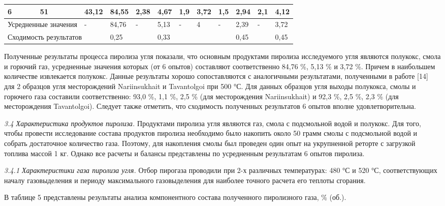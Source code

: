 \begin{table}[H]
{\begin{tabular}{|llllllllllll|}
\multicolumn{1}{|l|}{6} & \multicolumn{1}{l|}{51} & \multicolumn{1}{l|}{43,12} & \multicolumn{1}{l|}{84,55} & \multicolumn{1}{l|}{2,38} & \multicolumn{1}{l|}{4,67} & \multicolumn{1}{l|}{1,9} & \multicolumn{1}{l|}{3,72} & \multicolumn{1}{l|}{1,5} & \multicolumn{1}{l|}{2,94} & \multicolumn{1}{l|}{2,1} & 4,12 \\ \hline
\multicolumn{2}{|l|}{Усредненные значения} & \multicolumn{1}{l|}{-} & \multicolumn{1}{l|}{84,76} & \multicolumn{1}{l|}{-} & \multicolumn{1}{l|}{5,13} & \multicolumn{1}{l|}{-} & \multicolumn{1}{l|}{4} & \multicolumn{1}{l|}{-} & \multicolumn{1}{l|}{2,39} & \multicolumn{1}{l|}{-} & 3,72 \\ \hline
\multicolumn{3}{|l|}{Сходимость результатов} & \multicolumn{1}{l|}{0,25} & \multicolumn{1}{l|}{} & \multicolumn{1}{l|}{0,33} & \multicolumn{1}{l|}{} & \multicolumn{1}{l|}{} & \multicolumn{1}{l|}{} & \multicolumn{1}{l|}{0,45} & \multicolumn{1}{l|}{} & 0,45 \\ \hline
\end{tabular}
}
\end{table}

\begin{multicols}{2}
Полученные результаты процесса пиролиза угля показали, что основным
продуктами пиролиза исследуемого угля являются полукокс, смола и горючий
газ, усредненные значения которых (от 6 опытов) составляют
соответственно 84,76 \%, 5,13 \% и 3,72 \%. Причем в наибольшем
количестве извлекается полукокс. Данные результаты хорошо сопоставляются
с аналогичными результатами, полученными в работе {[}14{]} для 2
образцов угля месторождений Nariinsukhait и Tavantolgoi при 500 °С. Для
данных образцов угля выходы полукокса, смолы и горючего газа составили
соответственно: 93,0 \%, 1,1 \%, 2,5 \% (для месторождения
Nariinsukhait) и 92,3 \%, 2,5 \%, 2,3 \% (для месторождения
Tavantolgoi). Следует также отметить, что сходимость полученных
результатов 6 опытов вполне удовлетворительна.

\emph{3.4 Характеристика продуктов пиролиза.} Продуктами пиролиза угля
являются газ, смола с подсмольной водой и полукокс. Для того, чтобы
провести исследование состава продуктов пиролиза необходимо было
накопить около 50 грамм смолы с подсмольной водой и собрать достаточное
количество газа. Поэтому, для накопления смолы был проведен один опыт на
укрупненной реторте с загрузкой топлива массой 1 кг. Однако все расчеты
и балансы представлены по усредненным результатам 6 опытов пиролиза.

\emph{3.4.1 Характеристики газа пиролиза угля.} Отбор пирогаза проводили
при 2-х различных температурах: 480 °С и 520 °С, соответствующих началу
газовыделения и периоду максимального газовыделения для наиболее точного
расчета его теплоты сгорания.

В таблице 5 представлены результаты анализа компонентного состава
полученного пиролизного газа, \% (об.).
\end{multicols}


